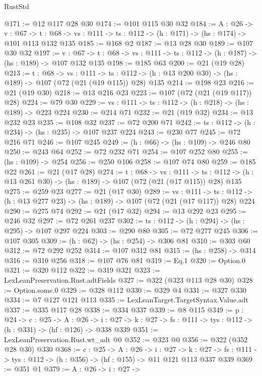 \begin{lexlean}{RustStd}
\begin{coremodule}
@171 := @12 @117 @28 @30
@174 := @101 @115 @30 @32
@184 := {A : @26} ->
  {v : @67} ->
  {t : @68} -> {vs : @111} -> {ts : @112} -> (h : @171) -> (hs : @174) -> @101 @113 @132 @135
@185 := @168 @2
@187 := @13 @28 @30
@189 := @107 @30 @32
@197 := {v : @67} ->
  {t : @68} -> {vs : @111} -> {ts : @112} -> (h : @187) -> (hs : @189) -> @107 @132 @135
@198 := @185 @63
@200 := @21 (@19 @28)
@213 := {t : @68} ->
  {vs : @111} ->
  {ts : @112} -> (h : @13 @200 @30) -> (hs : @189) -> @107 (@72 (@21 (@19 @115)) @28) @135
@214 := @198 @23
@216 := @21 (@19 @30)
@218 := @13 @216 @23
@223 := @107 (@72 (@21 (@19 @117)) @28)
@224 := @79 @30
@229 := {vs : @111} -> {ts : @112} -> (h : @218) -> (hs : @189) -> @223 @224
@230 := @214 @71
@232 := @21 (@19 @32)
@234 := @13 @232 @23
@235 := @108 @32
@237 := @72 @200 @71
@242 := {ts : @112} -> (h : @234) -> (hs : @235) -> @107 @237 @224
@243 := @230 @77
@245 := @72 @216 @71
@246 := @107 @245
@249 := (h : @66) -> (hs : @109) -> @246 @80
@250 := @243 @64
@252 := @72 @232 @71
@254 := @107 @252 @80
@255 := (hs : @109) -> @254
@256 := @250 @106
@258 := @107 @74 @80
@259 := @185 @22
@261 := @21 (@17 @28)
@274 := {t : @68} ->
  {vs : @111} ->
  {ts : @112} -> (h : @13 @261 @30) -> (hs : @189) -> @107 (@72 (@21 (@17 @115)) @28) @135
@275 := @259 @23
@277 := @21 (@17 @30)
@289 := {vs : @111} ->
  {ts : @112} -> (h : @13 @277 @23) -> (hs : @189) -> @107 (@72 (@21 (@17 @117)) @28) @224
@290 := @275 @74
@292 := @21 (@17 @32)
@294 := @13 @292 @23
@295 := @246 @32
@297 := @72 @261 @237
@302 := {ts : @112} -> (h : @294) -> (hs : @295) -> @107 @297 @224
@303 := @290 @80
@305 := @72 @277 @245
@306 := @107 @305
@309 := (h : @62) -> (hs : @254) -> @306 @81
@310 := @303 @60
@312 := @72 @292 @252
@314 := @107 @312 @81
@315 := (hs : @258) -> @314
@316 := @310 @256
@318 := @107 @76 @81
@319 := Eq.{1}
@320 := Option.{0}
@321 := @320 @112
@322 := @319 @321
@323 := LexLeanPreservation.Rust.adtFields
@327 := @322 (@323 @113 @28 @30)
@328 := Option.some.{0}
@329 := @328 @112
@330 := @329 @4
@331 := @327 @330
@334 := @7 @127 @121 @113
@335 := LexLeanTarget.TargetSyntax.Value.adt
@337 := @335 @117 @28
@338 := @334 @337
@339 := @8 @115
@349 := {p : @24} ->
  {c : @25} ->
  {A : @26} ->
  {i : @27} -> {k : @27} -> {fs : @111} -> {tys : @112} -> (h : @331) -> (hf : @126) -> @338 @339
@351 := LexLeanPreservation.Rust.wt_adt @0
@352 := @323 @0
@356 := @322 (@352 @28 @30) @330
@368 := {c : @25} ->
  {A : @26} ->
  {i : @27} ->
  {k : @27} -> {fs : @111} -> {tys : @112} -> (h : @356) -> (hf : @155) -> @11 @121 @113 @337 @339
@369 := @351 @1
@379 := {A : @26} ->
  {i : @27} ->

\end{coremodule}
\end{lexlean}
